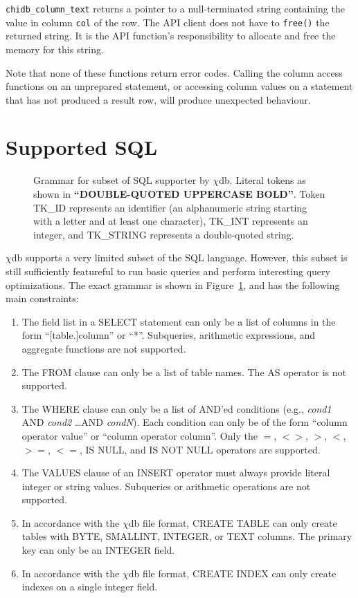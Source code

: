 \documentclass[10pt]{article}
\newcommand{\chidb}{$\chi$\textsf{db}}
\begin{document}
\verb+chidb_column_text+ returns a pointer to a null-terminated string containing the value in column \texttt{col} of the row. The API client does not have to \texttt{free()} the returned string. It is the API function's responsibility to allocate and free the memory for this string. 


Note that none of these functions return error codes. Calling the column access functions on an unprepared statement, or accessing column values on a statement that has not produced a result row, will produce unexpected behaviour.

\section{Supported SQL}
\label{sec:sql}

\begin{figure}

\caption{Grammar for subset of SQL supporter by \chidb. Literal tokens as shown in \textbf{``DOUBLE-QUOTED UPPERCASE BOLD''}. Token TK\_ID represents an identifier (an alphanumeric string starting with a letter and at least one character), TK\_INT represents an integer, and TK\_STRING represents a double-quoted string.}
\label{fig:sql}
\end{figure}

\chidb{} supports a very limited subset of the SQL language. However, this subset is still sufficiently featureful to run basic queries and perform interesting query optimizations. The exact grammar is shown in Figure~\ref{fig:sql}, and has the following main constraints:

\begin{enumerate}
\item The field list in a SELECT statement can only be a list of columns in the form ``[table.]column'' or ``*''. Subqueries, arithmetic expressions, and aggregate functions are not supported.
\item The FROM clause can only be a list of table names. The AS operator is not supported.
\item The WHERE clause can only be a list of AND'ed conditions (e.g., \emph{cond1} AND \emph{cond2} \ldots AND \emph{condN}). Each condition can only be of the form ``column operator value'' or ``column operator column''. Only the $=$, $<>$, $>$, $<$, $>=$, $<=$, IS NULL, and IS NOT NULL operators are supported.
\item The VALUES clause of an INSERT operator must always provide literal integer or string values. Subqueries or arithmetic operations are not supported.
\item In accordance with the \chidb{} file format, CREATE TABLE can only create tables with BYTE, SMALLINT, INTEGER, or TEXT columns. The primary key can only be an INTEGER field.
\item In accordance with the \chidb{} file format, CREATE INDEX can only create indexes on a single integer field.
\end{enumerate}
\end{document}
